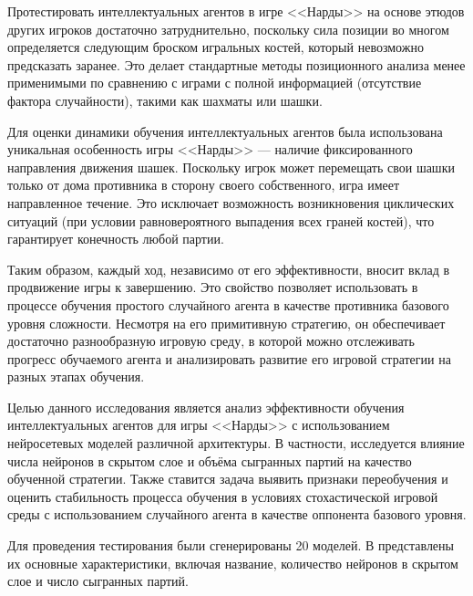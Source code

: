 Протестировать интеллектуальных агентов в игре <<Нарды>> на основе этюдов других игроков достаточно затруднительно, поскольку сила позиции во многом определяется следующим броском игральных костей, который невозможно предсказать заранее. Это делает стандартные методы позиционного анализа менее применимыми по сравнению с играми с полной информацией (отсутствие фактора случайности), такими как шахматы или шашки.

Для оценки динамики обучения интеллектуальных агентов была использована уникальная особенность игры <<Нарды>> --- наличие фиксированного направления движения шашек. Поскольку игрок может перемещать свои шашки только от дома противника в сторону своего собственного, игра имеет направленное течение. Это исключает возможность возникновения циклических ситуаций (при условии равновероятного выпадения всех граней костей), что гарантирует конечность любой партии.

Таким образом, каждый ход, независимо от его эффективности, вносит вклад в продвижение игры к завершению. Это свойство позволяет использовать в процессе обучения простого случайного агента в качестве противника базового уровня сложности. Несмотря на его примитивную стратегию, он обеспечивает достаточно разнообразную игровую среду, в которой можно отслеживать прогресс обучаемого агента и анализировать развитие его игровой стратегии на разных этапах обучения.

Целью данного исследования является анализ эффективности обучения интеллектуальных агентов для игры <<Нарды>> с использованием нейросетевых моделей различной архитектуры. В частности, исследуется влияние числа нейронов в скрытом слое и объёма сыгранных партий на качество обученной стратегии. Также ставится задача выявить признаки переобучения и оценить стабильность процесса обучения в условиях стохастической игровой среды с использованием случайного агента в качестве оппонента базового уровня.

Для проведения тестирования были сгенерированы 20 моделей. В  представлены их основные характеристики, включая название, количество нейронов в скрытом слое и число сыгранных партий.

